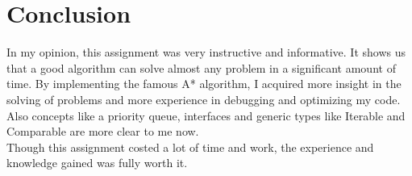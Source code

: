 \documentclass[12pt,a4paper,oneside]{article}
\begin{document}
\section{Conclusion}
In my opinion, this assignment was very instructive and informative. It shows us that a good algorithm can solve almost any problem in a significant amount of time. By implementing the famous A* algorithm, I acquired more insight in the solving of problems and more experience in debugging and optimizing my code.
Also concepts like a priority queue, interfaces and generic types like Iterable and Comparable are more clear to me now. \\
Though this assignment costed a lot of time and work, the experience and knowledge gained was fully worth it.
\newpage


\end{document}
